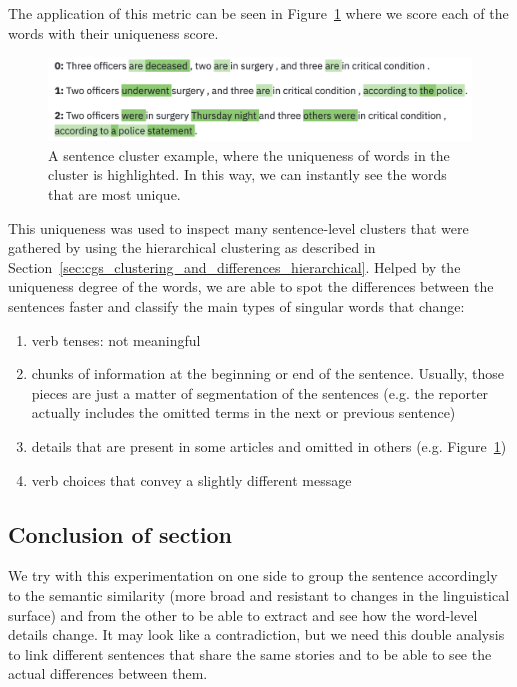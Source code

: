 The application of this metric can be seen in Figure~\ref{fig:words_uniqueness} where we score each of the words with their uniqueness score.

\begin{figure}[!htb]
    \centering
    \includegraphics[width=\textwidth]{figures/words_uniqueness.png}
    \caption{A sentence cluster example, where the uniqueness of words in the cluster is highlighted. In this way, we can instantly see the words that are most unique.}
    \label{fig:words_uniqueness}
\end{figure}


This uniqueness was used to inspect many sentence-level clusters that were gathered by using the hierarchical clustering as described in Section~\ref{sec:cgs_clustering_and_differences_hierarchical}. Helped by the uniqueness degree of the words, we are able to spot the differences between the sentences faster and classify the main types of singular words that change:
\begin{enumerate}
    \item verb tenses: not meaningful
    \item chunks of information at the beginning or end of the sentence. Usually, those pieces are just a matter of segmentation of the sentences (e.g. the reporter actually includes the omitted terms in the next or previous sentence) 
    \item details that are present in some articles and omitted in others (e.g. Figure~\ref{fig:words_uniqueness})
    \item verb choices that convey a slightly different message
\end{enumerate}

\subsection{Conclusion of section}
We try with this experimentation on one side to group the sentence accordingly to the semantic similarity (more broad and resistant to changes in the linguistical surface) and from the other to be able to extract and see how the word-level details change.
It may look like a contradiction, but we need this double analysis to link different sentences that share the same stories and to be able to see the actual differences between them.

